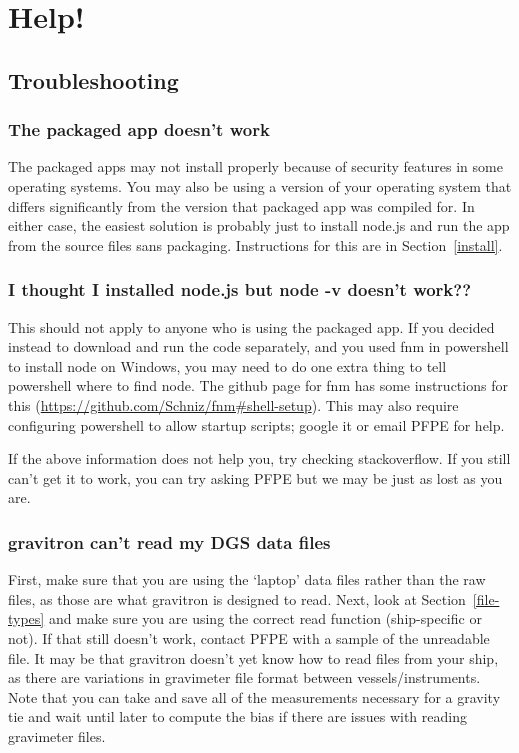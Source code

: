 \documentclass{pfpe-manual}
\begin{document}
\section{Help!}
\label{helphelp}

\subsection{Troubleshooting}

\subsubsection{The packaged app doesn't work}
The packaged apps may not install properly because of security features in some operating systems. You may also be using a version of your operating system that differs significantly from the version that packaged app was compiled for. In either case, the easiest solution is probably just to install node.js and run the app from the source files sans packaging. Instructions for this are in Section~\ref{install}.

\subsubsection{I thought I installed node.js but node -v doesn't work??}
This should not apply to anyone who is using the packaged app. If you decided instead to download and run the code separately, and you used fnm in powershell to install node on Windows, you may need to do one extra thing to tell powershell where to find node. The github page for fnm has some instructions for this (\url{https://github.com/Schniz/fnm#shell-setup}). This may also require configuring powershell to allow startup scripts; google it or email PFPE for help.

If the above information does not help you, try checking stackoverflow. If you still can't get it to work, you can try asking PFPE but we may be just as lost as you are.

\subsubsection{gravitron can't read my DGS data files}
First, make sure that you are using the `laptop' data files rather than the raw files, as those are what gravitron is designed to read. Next, look at Section~\ref{file-types} and make sure you are using the correct read function (ship-specific or not). If that still doesn't work, contact PFPE with a sample of the unreadable file. It may be that gravitron doesn't yet know how to read files from your ship, as there are variations in gravimeter file format between vessels/instruments. Note that you can take and save all of the measurements necessary for a gravity tie and wait until later to compute the bias if there are issues with reading gravimeter files.
\end{document}
